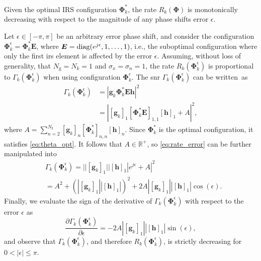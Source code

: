 \begin{theorem}
Given the optimal IRS configuration $\bm{\Phi}^*_k$, the rate $R_k(\bm{\Phi})$ is monotonically decreasing with respect to the magnitude of any phase shifts error $\epsilon$.
\end{theorem}
\begin{IEEEproof}
    Let $\epsilon\in [-\pi, \pi]$ be an arbitrary error phase shift, and consider the configuration $\bm{\Phi}_k^\epsilon = \bm{\Phi}^*_k \bm{E}$, where $\bm{E} = \operatorname*{diag}(e^{j\epsilon}, 1,\ldots,1)$, i.e., the suboptimal configuration where only the first \gls{irs} element is affected by the error $\epsilon$.
Assuming, without loss of generality, that $N_{\mathrm g}=N_k=1$ and $\sigma_x=\sigma_n=1$, the rate $R_k(\bm{\Phi}_k^\epsilon)$ is proportional to $\Gamma_k(\bm{\Phi}_k^\epsilon)$ when using configuration $\bm{\Phi}_k^\epsilon$. The \gls{snr} $\Gamma_k(\bm{\Phi}_k^\epsilon)$ can be written~as
\begin{align}
\label{eq:rate_error}
\Gamma_k(\bm{\Phi}_k^\epsilon) &= |\bm{g}_k \bm{\Phi}^*_k\bm{E} \bm{h}|^2 \\
&= \left|[\bm{g}_k]_1 [\bm{\Phi}^*_k\bm{E}]_{1,1} [\bm{h}]_1 + A \right|^2,
\end{align}
where $A = \sum_{n=2}^{N_{\mathrm I}}[\bm{g}_k]_n [\bm{\Phi}^*_k]_{n,n} [\bm{h}]_n$. Since $\bm{\Phi}^*_k$ is the optimal configuration, it satisfies \eqref{eq:theta_opt}. It follows that $A \in \mathbb{R}^+$, so \eqref{eq:rate_error} can be further manipulated into
\begin{align}
& \Gamma_k(\bm{\Phi}_k^\epsilon) = | |[\bm{g}_k]_1||[\bm{h}]_1|e^{j \epsilon} + A |^2 \\  
&= A^2 + (|[\bm{g}_k]_1||[\bm{h}]_1|)^2 + 2A|[\bm{g}_k]_1||[\bm{h}]_1|\cos(\epsilon).
\end{align}
Finally, we evaluate the sign of the derivative of $\Gamma_k(\bm{\Phi}_k^\epsilon)$ with respect to the error $\epsilon$ as
\begin{equation}
   \frac{\partial\Gamma_k(\bm{\Phi}_k^\epsilon)}{\partial\epsilon} = -2A|[\bm{g}_k]_1||[\bm{h}]_1|\sin(\epsilon),
\end{equation}
and observe that $\Gamma_k(\bm{\Phi}_k^\epsilon)$, and therefore $R_k(\bm{\Phi}_k^\epsilon)$, is strictly decreasing for $0< |\epsilon|\leq \pi$.
\end{IEEEproof}

